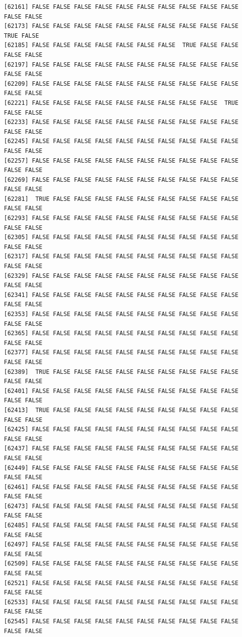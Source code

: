 \documentclass[
  a4paper,
  DIV=11,
  numbers=noendperiod]{scrartcl}
\begin{document}
\begin{verbatim}
[62161] FALSE FALSE FALSE FALSE FALSE FALSE FALSE FALSE FALSE FALSE FALSE FALSE
[62173] FALSE FALSE FALSE FALSE FALSE FALSE FALSE FALSE FALSE FALSE  TRUE FALSE
[62185] FALSE FALSE FALSE FALSE FALSE FALSE FALSE  TRUE FALSE FALSE FALSE FALSE
[62197] FALSE FALSE FALSE FALSE FALSE FALSE FALSE FALSE FALSE FALSE FALSE FALSE
[62209] FALSE FALSE FALSE FALSE FALSE FALSE FALSE FALSE FALSE FALSE FALSE FALSE
[62221] FALSE FALSE FALSE FALSE FALSE FALSE FALSE FALSE FALSE  TRUE FALSE FALSE
[62233] FALSE FALSE FALSE FALSE FALSE FALSE FALSE FALSE FALSE FALSE FALSE FALSE
[62245] FALSE FALSE FALSE FALSE FALSE FALSE FALSE FALSE FALSE FALSE FALSE FALSE
[62257] FALSE FALSE FALSE FALSE FALSE FALSE FALSE FALSE FALSE FALSE FALSE FALSE
[62269] FALSE FALSE FALSE FALSE FALSE FALSE FALSE FALSE FALSE FALSE FALSE FALSE
[62281]  TRUE FALSE FALSE FALSE FALSE FALSE FALSE FALSE FALSE FALSE FALSE FALSE
[62293] FALSE FALSE FALSE FALSE FALSE FALSE FALSE FALSE FALSE FALSE FALSE FALSE
[62305] FALSE FALSE FALSE FALSE FALSE FALSE FALSE FALSE FALSE FALSE FALSE FALSE
[62317] FALSE FALSE FALSE FALSE FALSE FALSE FALSE FALSE FALSE FALSE FALSE FALSE
[62329] FALSE FALSE FALSE FALSE FALSE FALSE FALSE FALSE FALSE FALSE FALSE FALSE
[62341] FALSE FALSE FALSE FALSE FALSE FALSE FALSE FALSE FALSE FALSE FALSE FALSE
[62353] FALSE FALSE FALSE FALSE FALSE FALSE FALSE FALSE FALSE FALSE FALSE FALSE
[62365] FALSE FALSE FALSE FALSE FALSE FALSE FALSE FALSE FALSE FALSE FALSE FALSE
[62377] FALSE FALSE FALSE FALSE FALSE FALSE FALSE FALSE FALSE FALSE FALSE FALSE
[62389]  TRUE FALSE FALSE FALSE FALSE FALSE FALSE FALSE FALSE FALSE FALSE FALSE
[62401] FALSE FALSE FALSE FALSE FALSE FALSE FALSE FALSE FALSE FALSE FALSE FALSE
[62413]  TRUE FALSE FALSE FALSE FALSE FALSE FALSE FALSE FALSE FALSE FALSE FALSE
[62425] FALSE FALSE FALSE FALSE FALSE FALSE FALSE FALSE FALSE FALSE FALSE FALSE
[62437] FALSE FALSE FALSE FALSE FALSE FALSE FALSE FALSE FALSE FALSE FALSE FALSE
[62449] FALSE FALSE FALSE FALSE FALSE FALSE FALSE FALSE FALSE FALSE FALSE FALSE
[62461] FALSE FALSE FALSE FALSE FALSE FALSE FALSE FALSE FALSE FALSE FALSE FALSE
[62473] FALSE FALSE FALSE FALSE FALSE FALSE FALSE FALSE FALSE FALSE FALSE FALSE
[62485] FALSE FALSE FALSE FALSE FALSE FALSE FALSE FALSE FALSE FALSE FALSE FALSE
[62497] FALSE FALSE FALSE FALSE FALSE FALSE FALSE FALSE FALSE FALSE FALSE FALSE
[62509] FALSE FALSE FALSE FALSE FALSE FALSE FALSE FALSE FALSE FALSE FALSE FALSE
[62521] FALSE FALSE FALSE FALSE FALSE FALSE FALSE FALSE FALSE FALSE FALSE FALSE
[62533] FALSE FALSE FALSE FALSE FALSE FALSE FALSE FALSE FALSE FALSE FALSE FALSE
[62545] FALSE FALSE FALSE FALSE FALSE FALSE FALSE FALSE FALSE FALSE FALSE FALSE

\end{verbatim}
\end{document}
